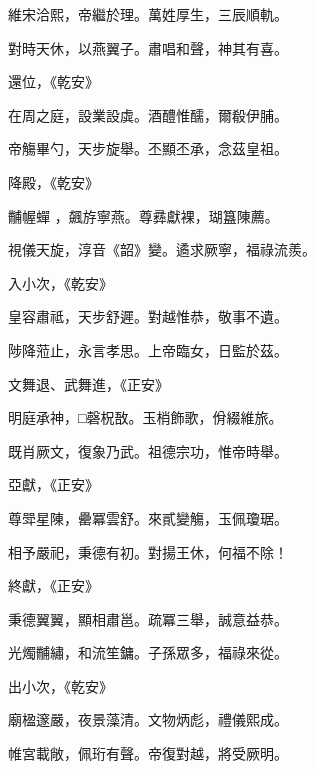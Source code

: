 \begin{pinyinscope}
 維宋洽熙，帝繼於理。萬姓厚生，三辰順軌。



 對時天休，以燕翼子。肅唱和聲，神其有喜。



 還位，《乾安》



 在周之庭，設業設虡。酒醴惟醹，爾殽伊脯。



 帝觴畢勺，天步旋舉。丕顯丕承，念茲皇祖。



 降殿，《乾安》


黼幄蟬
 ，飆斿寧燕。尊彞獻裸，瑚簋陳薦。



 視儀天旋，淳音《韶》變。遹求厥寧，福祿流羨。



 入小次，《乾安》



 皇容肅祗，天步舒遲。對越惟恭，敬事不遺。



 陟降蒞止，永言孝思。上帝臨女，日監於茲。



 文舞退、武舞進，《正安》



 明庭承神，□磬柷敔。玉梢飾歌，佾綴維旅。



 既肖厥文，復象乃武。祖德宗功，惟帝時舉。



 亞獻，《正安》



 尊斝星陳，罍冪雲舒。來貳變觴，玉佩瓊琚。



 相予嚴祀，秉德有初。對揚王休，何福不除！



 終獻，《正安》



 秉德翼翼，顯相肅邕。疏冪三舉，誠意益恭。



 光燭黼繡，和流笙鏞。子孫眾多，福祿來從。



 出小次，《乾安》



 廟楹邃嚴，夜景藻清。文物炳彪，禮儀熙成。



 帷宮載敞，佩珩有聲。帝復對越，將受厥明。




\end{pinyinscope}
